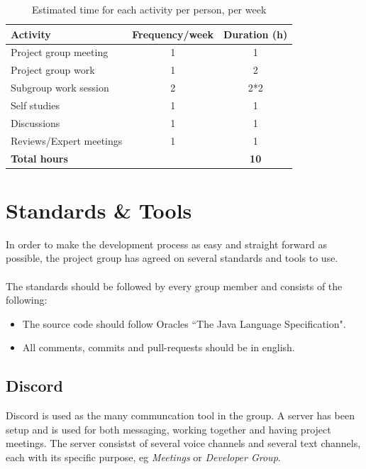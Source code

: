 \documentclass{article}
\begin{document}
        \begin{table}[h]
            \centering
            \begin{tabular}{|l|c|c|}
                \hline
                    \textbf{Activity} & \textbf{Frequency/week} & \textbf{Duration (h)} \\
                \hline
                    Project group meeting & 1 & 1 \\
                 \hline
                    Project group work & 1 & 2 \\
                 \hline
                    Subgroup work session & 2 & 2*2 \\
                 \hline
                    Self studies & 1  & 1 \\
                 \hline
                    Discussions & 1 & 1 \\
                 \hline
                    Reviews/Expert meetings & 1 & 1 \\
                 \hline
                    \textbf{Total hours} & & \textbf{10} \\
                 \hline
            \end{tabular}
            \caption{Estimated time for each activity per person, per week}
            \label{activitytable}
        \end{table}
    

\section{Standards \& Tools}    %
    In order to make the development process as easy and straight forward as possible,
    the project group has agreed on several standards and tools to use. 
    \\ \\
    The standards should be followed by every group member and consists of the following:
    \begin{itemize}
        \item The source code should follow Oracles ``The Java Language Specification".
        \item All comments, commits and pull-requests should be in english.
    \end{itemize}
    
    \subsection{Discord}
    Discord is used as the many communcation tool in the group. A server has been setup and is
    used for both messaging, working together and having project meetings.
    The server consistst of several voice channels and several text channels, each
    with its specific purpose, eg \textit{Meetings} or \textit{Developer Group}.
    
\end{document}
